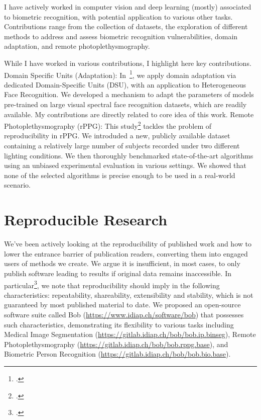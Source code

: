 \documentclass[a4paper,10pt,onecolumn]{article}
\begin{document}
I have actively worked in computer vision and deep learning (mostly) associated
to biometric recognition, with potential application to various other tasks.
Contributions range from the collection of datasets, the exploration of
different methods to address and assess biometric recognition vulnerabilities,
domain adaptation, and remote photoplethysmography.

While I have worked in various contributions, I highlight here key
contributions.  Domain Specific Units (Adaptation): In~\footcite{tifs-2019}, we
apply domain adaptation via dedicated Domain-Specific Units (DSU), with an
application to Heterogeneous Face Recognition.  We developed a mechanism to
adapt the parameters of models pre-trained on large visual spectral face
recognition datasets, which are readily available.  My contributions are
directly related to core idea of this work.  Remote Photoplethysmography
(rPPG):  This study\footcite{arxiv-2017-2} tackles the problem of
reproducibility in rPPG.  We introduded a new, publicly available dataset
containing a relatively large number of subjects recorded under two different
lighting conditions.  We then thoroughly benchmarked state-of-the-art
algorithms using an unbiased experimental evaluation in various settings.  We
showed that none of the selected algorithms is precise enough to be used in a
real-world scenario.

\section{Reproducible Research}

We've been actively looking at the reproducibility of published work and how to
lower the entrance barrier of publication readers, converting them into engaged
users of methods we create.  We argue it is insufficient, in most cases, to
only publish software leading to results if original data remains inaccessible.
In particular\footcite{icml-2017-1}, we note that reproducibility
should imply in the following characteristics: repeatability, shareability,
extensibility and stability, which is not guaranteed by most published material
to date.  We proposed an open-source software suite called Bob
(\url{https://www.idiap.ch/software/bob}) that possesses such characteristics,
demonstrating its flexibility to various tasks including Medical Image
Segmentation (\url{https://gitlab.idiap.ch/bob/bob.ip.binseg}), Remote
Photoplethysmography (\url{https://gitlab.idiap.ch/bob/bob.rppg.base}), and
Biometric Person Recognition (\url{https://gitlab.idiap.ch/bob/bob.bio.base}).
\end{document}
